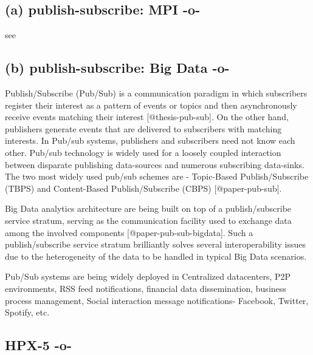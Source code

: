 \subsection{ (a) publish-subscribe: MPI -o-}

     see 
     
\subsection{ (b) publish-subscribe: Big Data -o-}

Publish/Subscribe (Pub/Sub) is a communication paradigm in which
subscribers register their interest as a pattern of events or topics
and then asynchronously receive events matching their
interest [@thesis-pub-sub].  On the other hand, publishers
generate events that are delivered to subscribers with matching
interests.  In Pub/sub systems, publishers and subscribers need not
know each other. Pub/sub technology is widely used for a loosely
coupled interaction between disparate publishing data-sources and
numerous subscribing data-sinks. The two most widely used pub/sub
schemes are - Topic-Based Publish/Subscribe (TBPS) and Content-Based
Publish/Subscribe (CBPS) [@paper-pub-sub].
      
Big Data analytics architecture are being built on top of a
publish/subscribe service stratum, serving as the communication
facility used to exchange data among the involved
components [@paper-pub-sub-bigdata]. Such a publish/subscribe
service stratum brilliantly solves several interoperability issues due
to the heterogeneity of the data to be handled in typical Big Data
scenarios.

     Pub/Sub systems are being widely deployed in Centralized
     datacenters, P2P environments, RSS feed notifications, financial
     data dissemination, business process management, Social
     interaction message notifications- Facebook, Twitter, Spotify,
     etc.



\subsection{HPX-5 -o-}

